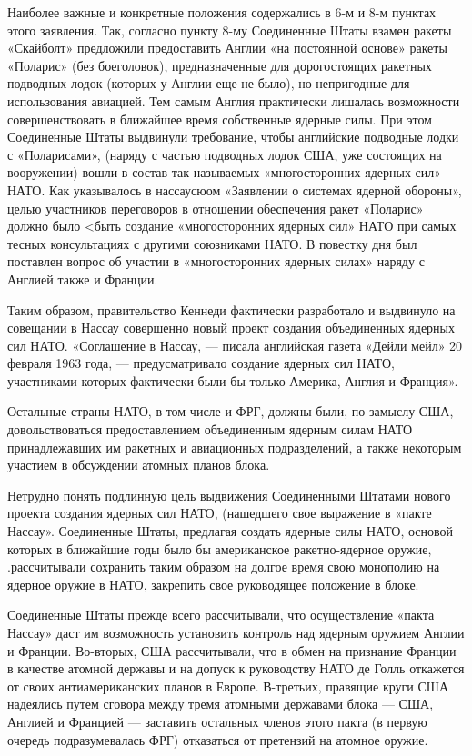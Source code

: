 \documentclass[12pt, a4paper, openany]{book}
\begin{document}
	Наиболее важные и конкретные положения содержались в 6-м и 8-м пунктах этого заявления. Так, согласно пункту 8-му Соединенные Штаты взамен ракеты «Скайболт» предложили предоставить Англии «на постоянной основе»  ракеты «Поларис» (без боеголовок), предназначенные для дорогостоящих ракетных подводных лодок (которых у Англии еще не было), но непригодные для использования авиацией. Тем самым Англия практически лишалась возможности  совершенствовать в ближайшее время собственные ядерные силы. При этом Соединенные Штаты выдвинули  требование, чтобы английские подводные лодки с «Поларисами», (наряду с частью подводных лодок США, уже состоящих на вооружении) вошли в состав так называемых  «многосторонних ядерных сил» НАТО. Как указывалось в нассаусюом «Заявлении о системах ядерной обороны», целью участников переговоров в отношении обеспечения ракет «Поларис»  должно было <быть создание «многосторонних ядерных сил» НАТО при самых тесных консультациях с другими  союзниками НАТО. В повестку дня был поставлен вопрос об участии в «многосторонних ядерных силах» наряду с Англией также и Франции.
	
	Таким образом, правительство Кеннеди фактически разработало и выдвинуло на совещании в Нассау совершенно новый проект создания объединенных ядерных сил НАТО. «Соглашение в Нассау, — писала английская газета «Дейли мейл» 20 февраля 1963 года, — предусматривало создание ядерных сил НАТО, участниками которых фактически были бы только Америка, Англия и Франция».
	
	Остальные страны НАТО, в том числе и ФРГ, должны  были, по замыслу США, довольствоваться предоставлением объединенным ядерным силам НАТО принадлежавших им ракетных и авиационных подразделений, а также некоторым участием в обсуждении атомных планов блока.
	
	Нетрудно понять подлинную цель выдвижения  Соединенными Штатами нового проекта создания ядерных сил НАТО, (нашедшего свое выражение в «пакте Нассау». Соединенные Штаты, предлагая создать ядерные силы НАТО, основой  которых в ближайшие годы было бы американское ракетно-ядерное оружие, .рассчитывали сохранить таким образом на долгое время свою монополию на ядерное оружие в НАТО, закрепить свое руководящее положение в блоке.
	
	Соединенные Штаты прежде всего рассчитывали, что  осуществление «пакта Нассау» даст им возможность установить контроль над ядерным оружием Англии и Франции.  Во-вторых, США рассчитывали, что в обмен на признание Франции в качестве атомной державы и на допуск к руководству НАТО де Голль откажется от своих антиамериканских  планов в Европе. В-третьих, правящие круги США надеялись путем сговора между тремя атомными державами блока — США, Англией и Францией — заставить остальных членов этого пакта (в первую очередь подразумевалась ФРГ)  отказаться от претензий на атомное оружие.
	
\end{document}
